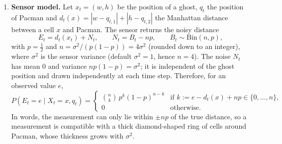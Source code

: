 \documentclass{article}
\begin{document}
\begin{enumerate}[label=\alph*.,leftmargin=*]
    \item \textbf{Sensor model.}
    Let $x_t=(w,h)$ be the position of a ghost, $q_t$ the position of Pacman
    and $d_t(x)=|w-q_{t,1}|+|h-q_{t,2}|$ the Manhattan distance between a
    cell $x$ and Pacman. The sensor returns the noisy distance
    \begin{equation*}
        E_t = d_t(x_t) + N_t, \qquad N_t = B_t - np, \qquad
        B_t \sim \mathrm{Bin}(n,p),
    \end{equation*}
    with $p=\tfrac12$ and $n=\sigma^2/(p(1-p))=4\sigma^2$ (rounded down to an
    integer), where $\sigma^2$ is the sensor variance (default $\sigma^2=1$,
    hence $n=4$). The noise $N_t$ has mean $0$ and variance
    $np(1-p)=\sigma^2$; it is independent of the ghost position and drawn
    independently at each time step. Therefore, for an observed value $e$,
    \begin{equation*}
        P(E_t=e \mid X_t=x, q_t) =
        \begin{cases}
            \binom{n}{k}\,p^{k}(1-p)^{n-k}
                & \text{if } k := e - d_t(x) + np \in \{0,\dots,n\},\\
            0 & \text{otherwise.}
        \end{cases}
    \end{equation*}
    In words, the measurement can only lie within $\pm np$ of the true
    distance, so a measurement is compatible with a thick diamond-shaped ring
    of cells around Pacman, whose thickness grows with $\sigma^2$.


\end{enumerate}
\end{document}
